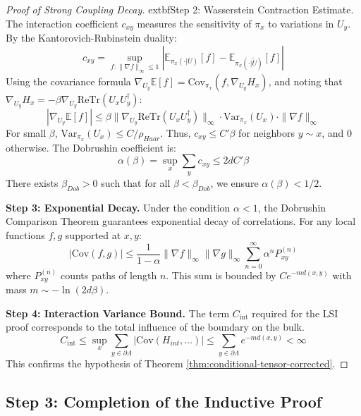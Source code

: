 \begin{theorem}
\begin{proof}[Proof of Strong Coupling Decay]
	extbf{Step 2: Wasserstein Contraction Estimate.}
The interaction coefficient $c_{xy}$ measures the sensitivity of $\pi_x$ to variations in $U_y$. By the Kantorovich-Rubinstein duality:
\begin{equation}
c_{xy} = \sup_{f: \|\nabla f\|_\infty \le 1} \left| \mathbb{E}_{\pi_x(\cdot|U)}[f] - \mathbb{E}_{\pi_x(\cdot|\tilde{U})}[f] \right|
\end{equation}
Using the covariance formula $\nabla_{U_y} \mathbb{E}[f] = \mathrm{Cov}_{\pi_x}(f, \nabla_{U_y} H_x)$, and noting that $\nabla_{U_y} H_x = -\beta \nabla_{U_y} \mathrm{Re}\mathrm{Tr}(U_x U_y^\dagger)$:
\begin{equation}
|\nabla_{U_y} \mathbb{E}[f]| \le \beta \|\nabla_{U_y} \mathrm{Re}\mathrm{Tr}(U_x U_y^\dagger)\|_\infty \cdot \mathrm{Var}_{\pi_x}(U_x) \cdot \|\nabla f\|_\infty
\end{equation}
For small $\beta$, $\mathrm{Var}_{\pi_x}(U_x) \le C / \rho_{Haar}$.
Thus, $c_{xy} \le C' \beta$ for neighbors $y \sim x$, and 0 otherwise.
The Dobrushin coefficient is:
\begin{equation}
\alpha(\beta) = \sup_x \sum_y c_{xy} \le 2d C' \beta
\end{equation}
There exists $\beta_{Dob} > 0$ such that for all $\beta < \beta_{Dob}$, we ensure $\alpha(\beta) < 1/2$.

\textbf{Step 3: Exponential Decay.}
Under the condition $\alpha < 1$, the Dobrushin Comparison Theorem guarantees exponential decay of correlations. For any local functions $f, g$ supported at $x, y$:
\begin{equation}
|\mathrm{Cov}(f, g)| \le \frac{1}{1-\alpha} \|\nabla f\|_\infty \|\nabla g\|_\infty \sum_{n=0}^\infty \alpha^n P_{xy}^{(n)}
\end{equation}
where $P_{xy}^{(n)}$ counts paths of length $n$. This sum is bounded by $C e^{-m d(x,y)}$ with mass $m \sim -\ln(2d \beta)$.

\textbf{Step 4: Interaction Variance Bound.}
The term $C_{\mathrm{int}}$ required for the LSI proof corresponds to the total influence of the boundary on the bulk.
\begin{equation}
C_{\mathrm{int}} \le \sup_x \sum_{y \in \partial \Lambda} |\mathrm{Cov}(H_{int}, \dots)| \le \sum_{y \in \partial \Lambda} e^{-m d(x, y)} < \infty
\end{equation}
This confirms the hypothesis of Theorem \ref{thm:conditional-tensor-corrected}.
\end{proof}

\subsection{Step 3: Completion of the Inductive Proof}


\end{theorem}
